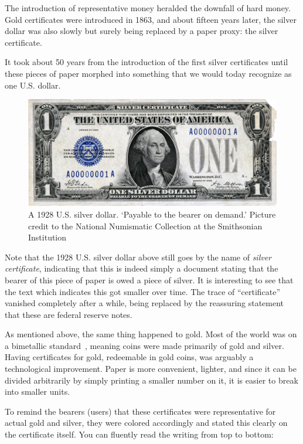 The introduction of representative money heralded the downfall of hard
money. Gold certificates were introduced in 1863, and about fifteen
years later, the silver dollar was also slowly but surely being replaced
by a paper proxy: the silver certificate. \cite{wiki:silver-certificate}

It took about 50 years from the introduction of the first silver
certificates until these pieces of paper morphed into something that we
would today recognize as one U.S. dollar.

\begin{figure}
  \centering
  \includegraphics{assets/images/us-silver-dollar-note-smaller.png}
  \caption{A 1928 U.S. silver dollar. `Payable to the bearer on demand.' Picture credit to the National Numismatic Collection at the Smithsonian Institution}
  \label{fig:us-silver-dollar-note-smaller}
\end{figure}

Note that the 1928 U.S. silver dollar above still goes by the name of
\textit{silver certificate}, indicating that this is indeed simply a document
stating that the bearer of this piece of paper is owed a piece of
silver. It is interesting to see that the text which indicates this got
smaller over time. The trace of \enquote{certificate} vanished completely after
a while, being replaced by the reassuring statement that these are
federal reserve notes.

As mentioned above, the same thing happened to gold. Most of the world was on a
bimetallic standard~\cite{wiki:bimetallism}, meaning coins were made
primarily of gold and silver. Having certificates for gold, redeemable in gold
coins, was arguably a technological improvement. Paper is more convenient,
lighter, and since it can be divided arbitrarily by simply printing a smaller
number on it, it is easier to break into smaller units.

To remind the bearers (users) that these certificates were
representative for actual gold and silver, they were colored accordingly
and stated this clearly on the certificate itself. You can fluently read
the writing from top to bottom:


